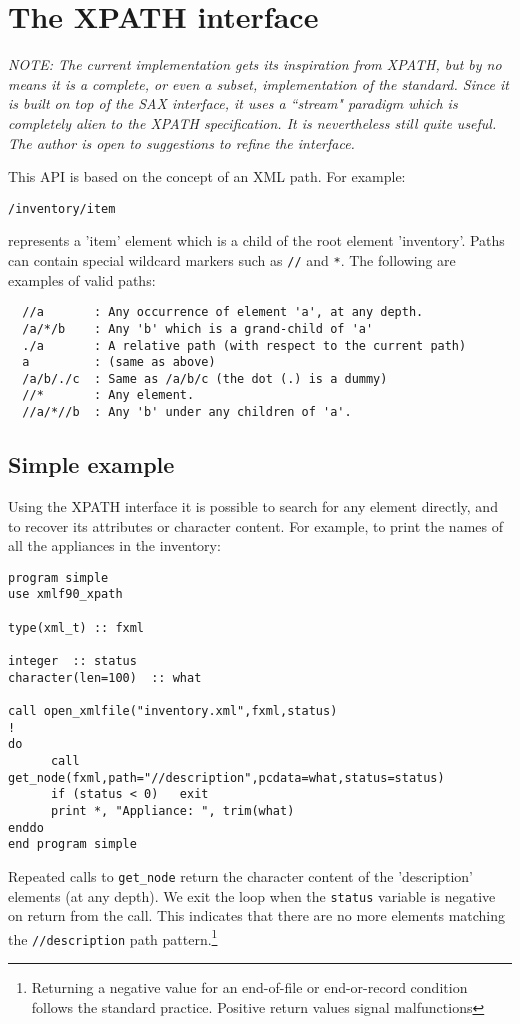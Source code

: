 \documentclass[11pt]{article}
\begin{document}
\section{The XPATH interface}

\textsl{NOTE: The current implementation gets its inspiration from
XPATH, but by no means it is a complete, or even a subset,
implementation of the standard. Since it is built on top of the SAX
interface, it uses a ``stream" paradigm which is completely alien to
the XPATH specification. It is nevertheless still quite useful. The
author is open to suggestions to refine the interface.}

\bigskip

This API is based on the concept of an XML path. For example:
%
\begin{verbatim}
/inventory/item
\end{verbatim}
%
represents a 'item' element which is a child of the root element
'inventory'. Paths can contain special wildcard markers such as
\texttt{//} and \texttt{*}. The following are examples of valid paths:
%
\begin{verbatim}
  //a       : Any occurrence of element 'a', at any depth.
  /a/*/b    : Any 'b' which is a grand-child of 'a'
  ./a       : A relative path (with respect to the current path)
  a         : (same as above)
  /a/b/./c  : Same as /a/b/c (the dot (.) is a dummy)
  //*       : Any element.
  //a/*//b  : Any 'b' under any children of 'a'.

\end{verbatim}
%
\subsection{Simple example}
Using the XPATH interface it is possible to search for any element
directly, and to recover its attributes or character content. For
example, to print the names of all the appliances in the inventory:
%
\begin{verbatim}
program simple
use xmlf90_xpath

type(xml_t) :: fxml

integer  :: status
character(len=100)  :: what

call open_xmlfile("inventory.xml",fxml,status)
!
do
      call get_node(fxml,path="//description",pcdata=what,status=status)
      if (status < 0)   exit
      print *, "Appliance: ", trim(what)
enddo
end program simple
\end{verbatim}
%
Repeated calls to \texttt{get\_node} return the character content of
the 'description' elements (at any depth). We exit the loop when the
\texttt{status} variable is negative on return from the call. This
indicates that there are no more elements matching the
\texttt{//description} path pattern.\footnote{Returning a negative
value for an end-of-file or end-or-record condition follows the
standard practice. Positive return values signal malfunctions}
\end{document}
